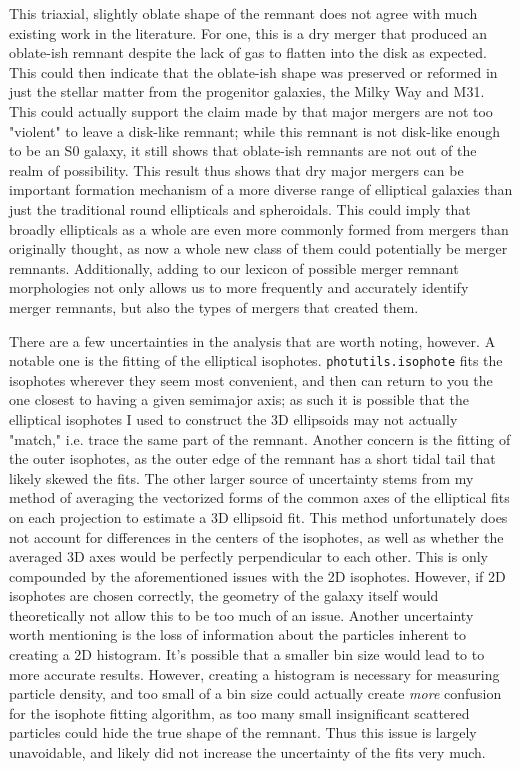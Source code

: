 \documentclass[twocolumn]{aastex631}
\begin{document}
This triaxial, slightly oblate shape of the remnant does not agree with much existing work in the literature. 
For one, this is a dry merger that produced an oblate-ish remnant despite the lack of gas to flatten into the disk as \cite{Barnes+1992} expected. 
This could then indicate that the oblate-ish shape was preserved or reformed in just the stellar matter from the progenitor galaxies, the Milky Way and M31. 
This could actually support the claim made by \cite{Eliche-Moral+2018} that major mergers are not too "violent" to leave a disk-like remnant; while this remnant is not disk-like enough to be an S0 galaxy, it still shows that oblate-ish remnants are not out of the realm of possibility.
This result thus shows that dry major mergers can be important formation mechanism of a more diverse range of elliptical galaxies than just the traditional round ellipticals and spheroidals. 
This could imply that broadly ellipticals as a whole are even more commonly formed from mergers than originally thought, as now a whole new class of them could potentially be merger remnants.
Additionally, adding to our lexicon of possible merger remnant morphologies not only allows us to more frequently and accurately identify merger remnants, but also the types of mergers that created them.

There are a few uncertainties in the analysis that are worth noting, however. 
A notable one is the fitting of the elliptical isophotes.
\texttt{photutils.isophote} fits the isophotes wherever they seem most convenient, and then can return to you the one closest to having a given semimajor axis; as such it is possible that the elliptical isophotes I used to construct the 3D ellipsoids may not actually "match," i.e. trace the same part of the remnant. 
Another concern is the fitting of the outer isophotes, as the outer edge of the remnant has a short tidal tail that likely skewed the fits.
The other larger source of uncertainty stems from my method of averaging the vectorized forms of the common axes of the elliptical fits on each projection to estimate a 3D ellipsoid fit. 
This method unfortunately does not account for differences in the centers of the isophotes, as well as whether the averaged 3D axes would be perfectly perpendicular to each other.
This is only compounded by the aforementioned issues with the 2D isophotes.
However, if 2D isophotes are chosen correctly, the geometry of the galaxy itself would theoretically not allow this to be too much of an issue.
Another uncertainty worth mentioning is the loss of information about the particles inherent to creating a 2D histogram.
It's possible that a smaller bin size would lead to to more accurate results.
However, creating a histogram is necessary for measuring particle density, and too small of a bin size could actually create \textit{more} confusion for the isophote fitting algorithm, as too many small insignificant scattered particles could hide the true shape of the remnant. 
Thus this issue is largely unavoidable, and likely did not increase the uncertainty of the fits very much.



{}

\end{document}
